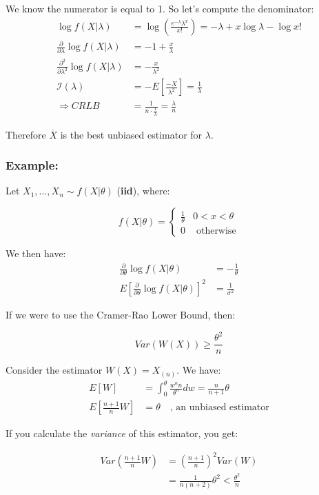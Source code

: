 \documentclass{article}
\begin{document}
We know the numerator is equal to 1. So let's compute the denominator:
\begin{equation*}
    \begin{split}
        \log f(X|\lambda) &= \log \left(\frac{e^{-\lambda}\lambda^x}{x!}\right) = -\lambda + x\log \lambda - \log x!  \\
        \frac{\partial}{\partial \lambda} \log f(X|\lambda) &= -1 + \frac{x}{\lambda}\\
        \frac{\partial^2}{\partial \lambda^2} \log f(X|\lambda) &= -\frac{x}{\lambda^2}\\
        \mathcal{I}(\lambda) &= -E\left[\frac{-X}{\lambda^2} \right] = \frac{1}{\lambda}\\
        \Rightarrow CRLB &= \frac{1}{n \cdot \frac{1}{\lambda}} = \frac{\lambda}{n}
    \end{split}
\end{equation*}

Therefore $\overline{X}$ is the best unbiased estimator for $\lambda$.


\subsubsection*{Example:}

Let $X_1,\dots,X_n \sim f(X|\theta)$ (\textbf{iid}), where:

\begin{equation*}
    f(X|\theta) = \begin{cases}
        \frac{1}{\theta} & 0 < x < \theta\\
        0 & \text{ otherwise}
    \end{cases}
\end{equation*}

We then have:
\begin{equation*}
    \begin{split}
        \frac{\partial}{\partial\theta} \log f(X|\theta) &= -\frac{1}{\theta}\\
        E\left[\frac{\partial}{\partial \theta} \log f(X|\theta) \right]^2 &= \frac{1}{\sigma^2}
    \end{split}
\end{equation*}

If we were to use the Cramer-Rao Lower Bound, then:

\begin{equation*}
    Var(W(X)) \geq \frac{\theta^2}{n}
\end{equation*}

Consider the estimator $W(X) = X_{(n)}$. We have:
\begin{equation*}
\begin{split}
    E[W] &= \int_0^\theta \frac{w^n n}{\theta^n} dw = \frac{n}{n+1}\theta\\
    E\left[\frac{n+1}{n} W \right] &= \theta \quad \text{, an unbiased estimator}
\end{split}
\end{equation*}

If you calculate the \textit{variance} of this estimator, you get:

\begin{equation*}
    \begin{split}
        Var\left(\frac{n+1}{n} W \right) &= \left(\frac{n+1}{n} \right)^2 Var(W)\\
        &= \frac{1}{n(n+2)} \theta^2 < \frac{\theta^2}{n}
    \end{split}
\end{equation*}
\end{document}
